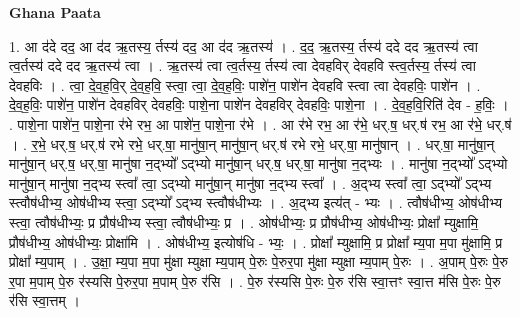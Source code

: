 \documentclass[17pt]{extarticle}
\begin{document}
\textbf{Ghana Paata } \newline

1. आ द॑दे दद॒ आ द॑द ऋ॒तस्य॒ र्तस्य॑ दद॒ आ द॑द ऋ॒तस्य॑ । . द॒द॒ ऋ॒तस्य॒ र्तस्य॑ ददे दद ऋ॒तस्य॑ त्वा त्व॒र्तस्य॑ ददे दद ऋ॒तस्य॑ त्वा । . ऋ॒तस्य॑ त्वा त्व॒र्तस्य॒ र्तस्य॑ त्वा देवहविर् देवहवि स्त्व॒र्तस्य॒ र्तस्य॑ त्वा देवहविः । . त्वा॒ दे॒व॒ह॒वि॒र् दे॒व॒ह॒वि॒ स्त्वा॒ त्वा॒ दे॒व॒ह॒विः॒ पाशे॑न॒ पाशे॑न देवहवि स्त्वा त्वा देवहविः॒ पाशे॑न । . दे॒व॒ह॒विः॒ पाशे॑न॒ पाशे॑न देवहविर् देवहविः॒ पाशे॒ना पाशे॑न देवहविर् देवहविः॒ पाशे॒ना । . दे॒व॒ह॒वि॒रिति॑ देव - ह॒विः॒ । . पाशे॒ना पाशे॑न॒ पाशे॒ना र॑भे रभ॒ आ पाशे॑न॒ पाशे॒ना र॑भे । . आ र॑भे रभ॒ आ र॑भे॒ धर्.ष॒ धर्.ष॑ रभ॒ आ र॑भे॒ धर्.ष॑ । . र॒भे॒ धर्.ष॒ धर्.ष॑ रभे रभे॒ धर्.षा॒ मानु॑षा॒न् मानु॑षा॒न् धर्.ष॑ रभे रभे॒ धर्.षा॒ मानु॑षान् । . धर्.षा॒ मानु॑षा॒न् मानु॑षा॒न् धर्.ष॒ धर्.षा॒ मानु॑षा न॒द्भ्यो᳚ ऽद्भ्यो मानु॑षा॒न् धर्.ष॒ धर्.षा॒ मानु॑षा न॒द्भ्यः । . मानु॑षा न॒द्भ्यो᳚ ऽद्भ्यो मानु॑षा॒न् मानु॑षा न॒द्भ्य स्त्वा᳚ त्वा॒ ऽद्भ्यो मानु॑षा॒न् मानु॑षा न॒द्भ्य स्त्वा᳚ । . अ॒द्भ्य स्त्वा᳚ त्वा॒ ऽद्भ्यो᳚ ऽद्भ्य स्त्वौष॑धीभ्य॒ ओष॑धीभ्य स्त्वा॒ ऽद्भ्यो᳚ ऽद्भ्य स्त्वौष॑धीभ्यः । . अ॒द्भ्य इत्य॑त् - भ्यः । . त्वौष॑धीभ्य॒ ओष॑धीभ्य स्त्वा॒ त्वौष॑धीभ्यः॒ प्र प्रौष॑धीभ्य स्त्वा॒ त्वौष॑धीभ्यः॒ प्र । . ओष॑धीभ्यः॒ प्र प्रौष॑धीभ्य॒ ओष॑धीभ्यः॒ प्रोक्षा᳚ म्युक्षामि॒ प्रौष॑धीभ्य॒ ओष॑धीभ्यः॒ प्रोक्षा॑मि । . ओष॑धीभ्य॒ इत्योष॑धि - भ्यः॒ । . प्रोक्षा᳚ म्युक्षामि॒ प्र प्रोक्षा᳚ म्य॒पा म॒पा मु॑क्षामि॒ प्र प्रोक्षा᳚ म्य॒पाम् । . उ॒क्षा॒ म्य॒पा म॒पा मु॑क्षा म्युक्षा म्य॒पाम् पे॒रुः पे॒रुर॒पा मु॑क्षा म्युक्षा म्य॒पाम् पे॒रुः । . अ॒पाम् पे॒रुः पे॒रु र॒पा म॒पाम् पे॒रु र॑स्यसि पे॒रुर॒पा म॒पाम् पे॒रु र॑सि । . पे॒रु र॑स्यसि पे॒रुः पे॒रु र॑सि स्वा॒त्तꣳ स्वा॒त्त म॑सि पे॒रुः पे॒रु र॑सि स्वा॒त्तम् । \newline
\end{document}
